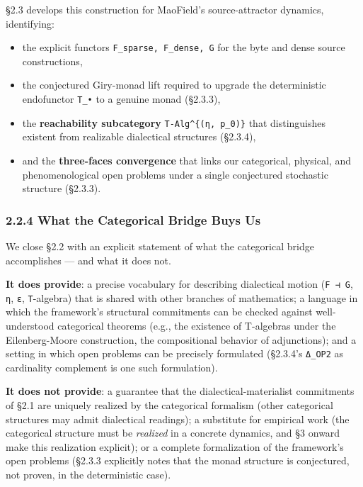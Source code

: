 \documentclass[
]{article}
\providecommand{\tightlist}{%
  \setlength{\itemsep}{0pt}\setlength{\parskip}{0pt}}
\begin{document}
§2.3 develops this construction for MaoField's source-attractor
dynamics, identifying:

\begin{itemize}
\tightlist
\item
  the explicit functors \texttt{F\_sparse,\ F\_dense,\ G} for the byte
  and dense source constructions,
\item
  the conjectured Giry-monad lift required to upgrade the deterministic
  endofunctor \texttt{T\_•} to a genuine monad (§2.3.3),
\item
  the \textbf{reachability subcategory} \texttt{T-Alg\^{}\{(η,\ p\_0)\}}
  that distinguishes existent from realizable dialectical structures
  (§2.3.4),
\item
  and the \textbf{three-faces convergence} that links our categorical,
  physical, and phenomenological open problems under a single
  conjectured stochastic structure (§2.3.3).
\end{itemize}

\hypertarget{what-the-categorical-bridge-buys-us}{%
\subsubsection{2.2.4 What the Categorical Bridge Buys
Us}\label{what-the-categorical-bridge-buys-us}}

We close §2.2 with an explicit statement of what the categorical bridge
accomplishes --- and what it does not.

\textbf{It does provide}: a precise vocabulary for describing
dialectical motion (\texttt{F\ ⊣\ G}, \texttt{η}, \texttt{ε},
\texttt{T}-algebra) that is shared with other branches of mathematics; a
language in which the framework's structural commitments can be checked
against well-understood categorical theorems (e.g., the existence of
T-algebras under the Eilenberg-Moore construction, the compositional
behavior of adjunctions); and a setting in which open problems can be
precisely formulated (§2.3.4's \texttt{Δ\_OP2} as cardinality complement
is one such formulation).

\textbf{It does not provide}: a guarantee that the
dialectical-materialist commitments of §2.1 are uniquely realized by the
categorical formalism (other categorical structures may admit
dialectical readings); a substitute for empirical work (the categorical
structure must be \emph{realized} in a concrete dynamics, and §3 onward
make this realization explicit); or a complete formalization of the
framework's open problems (§2.3.3 explicitly notes that the monad
structure is conjectured, not proven, in the deterministic case).
\end{document}

